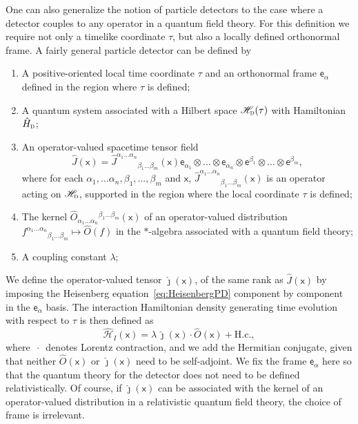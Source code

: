 \documentclass[letterpaper,12pt,titlepage,oneside,final]{book}
\newcommand{\mf}{\mathsf}%
\newcommand{\tc}[1]{\textsc{#1}}
\begin{document}
One can also generalize the notion of particle detectors to the case where a detector couples to any operator in a quantum field theory. For this definition we require not only a timelike coordinate $\tau$, but also a locally defined orthonormal frame. A fairly general particle detector can be defined by
\begin{enumerate}
    \item[\textbf{1.}] A positive-oriented local time coordinate $\tau$ and an orthonormal frame $\mf e_{\alpha}$ defined in the region where $\tau$ is defined;
    \item[\textbf{2.}] A quantum system associated with a Hilbert space $\mathscr{H}_\tc{d}(\tau)$ with Hamiltonian $\hat{H}_\tc{d}$;
    \item[\textbf{3.}] An operator-valued spacetime tensor field 
    \begin{equation}
        \hat{J}(\mf x) = \hat{J}^{\alpha_1...\alpha_n}{}_{\beta_1...\beta_m}(\mf x)\mf e_{\alpha_1}\otimes...\otimes \mf e_{\alpha_n} \otimes \mf e^{\beta_1}\otimes ... \otimes \mf e^{\beta_m},
    \end{equation} 
    where for each $\alpha_1,...\alpha_n,\beta_1,...,\beta_m$ and $\mf x$, $\hat{J}^{\alpha_1...\alpha_n}{}_{\beta_1...\beta_m}(\mf x)$ is an operator acting on $\mathscr{H}_\tc{d}$, supported in the region where the local coordinate $\tau$ is defined;
    \item[\textbf{4.}] The kernel $\hat{O}_{\alpha_1...\alpha_n}{}^{\beta_1...\beta_m}(\mf x)$ of an operator-valued distribution $f^{\alpha_1...\alpha_n}{}_{\beta_1...\beta_m}\mapsto \hat{O}(f)$ in the $\ast$-algebra associated with a quantum field theory;
    \item[\textbf{5.}] A coupling constant $\lambda$;
\end{enumerate}
We define the operator-valued tensor $\hat{\jmath}(\mf x)$, of the same rank as $\hat{J}(\mf x)$ by imposing the Heisenberg equation~\eqref{eq:HeisenbergPD} component by component in the $\mf e_\alpha$ basis. The interaction Hamiltonian density generating time evolution with respect to $\tau$ is then defined as
\begin{equation}\label{eq:PDgeneralTensor}
    \hat{\mathcal{H}}_I(\mf x) = \lambda\, \hat{\jmath}(\mf x) \cdot \hat{O}(\mf x) + \text{H.c.},
\end{equation}
where $\,\cdot\,$ denotes Lorentz contraction, and we add the Hermitian conjugate, given that neither $\hat{O}(\mf x)$ or $\hat{\jmath}(\mf x)$ need to be self-adjoint. We fix the frame $\mf e_\alpha$ here so that the quantum theory for the detector does not need to be defined relativistically. Of course, if $\hat{\jmath}(\mf x)$ can be associated with the kernel of an operator-valued distribution in a relativistic quantum field theory, the choice of frame is irrelevant.
\end{document}
